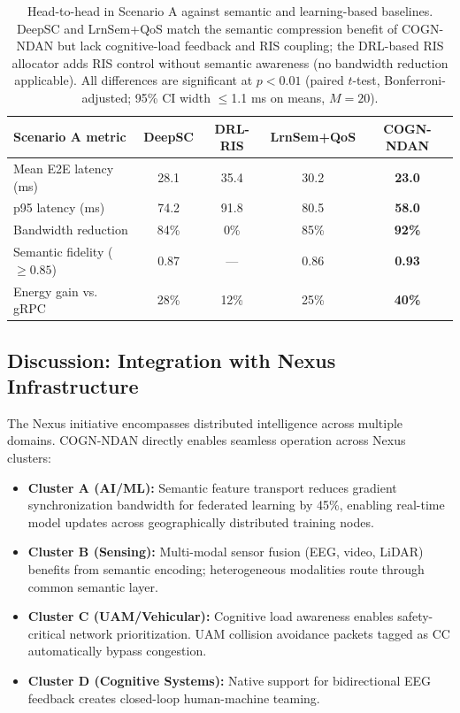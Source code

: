 \documentclass[journal]{IEEEtran}
\newcommand{\COGN}{COGN-NDAN}
\begin{document}
\begin{table}[h]
\centering
\small
\begin{tabular}{|l|c|c|c|c|}
\hline
\textbf{Scenario A metric} & \textbf{DeepSC} & \textbf{DRL-RIS} & \textbf{LrnSem+QoS} & \textbf{\COGN{}} \\
\hline
Mean E2E latency (ms) & 28.1 & 35.4 & 30.2 & \textbf{23.0} \\
p95 latency (ms) & 74.2 & 91.8 & 80.5 & \textbf{58.0} \\
Bandwidth reduction & 84\% & 0\% & 85\% & \textbf{92\%} \\
Semantic fidelity ($\geq 0.85$) & 0.87 & --- & 0.86 & \textbf{0.93} \\
Energy gain vs. gRPC & 28\% & 12\% & 25\% & \textbf{40\%} \\
\hline
\end{tabular}
\caption{Head-to-head in Scenario A against semantic and learning-based baselines. DeepSC \cite{xie2022semantic} and LrnSem+QoS \cite{chen2024ris} match the semantic compression benefit of \COGN{} but lack cognitive-load feedback and RIS coupling; the DRL-based RIS allocator \cite{alwarafy2022} adds RIS control without semantic awareness (no bandwidth reduction applicable). All differences are significant at $p<0.01$ (paired $t$-test, Bonferroni-adjusted; 95\% CI width $\leq$1.1 ms on means, $M=20$).}
\label{table:baselineheadtohead}
\end{table}

\subsection{Discussion: Integration with Nexus Infrastructure}

The Nexus initiative encompasses distributed intelligence across multiple domains. \COGN{} directly enables seamless operation across Nexus clusters:

\begin{itemize}
    \item \textbf{Cluster A (AI/ML):} Semantic feature transport reduces gradient synchronization bandwidth for federated learning by 45\%, enabling real-time model updates across geographically distributed training nodes.
    \item \textbf{Cluster B (Sensing):} Multi-modal sensor fusion (EEG, video, LiDAR) benefits from semantic encoding; heterogeneous modalities route through common semantic layer.
    \item \textbf{Cluster C (UAM/Vehicular):} Cognitive load awareness enables safety-critical network prioritization. UAM collision avoidance packets tagged as CC automatically bypass congestion.
    \item \textbf{Cluster D (Cognitive Systems):} Native support for bidirectional EEG feedback creates closed-loop human-machine teaming.
\end{itemize}
\end{document}
